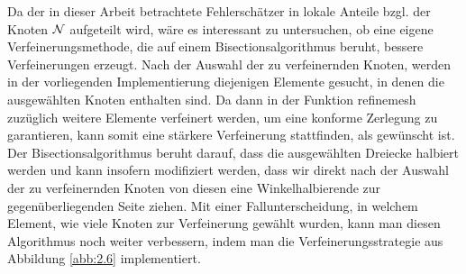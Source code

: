 Da der in dieser Arbeit betrachtete Fehlerschätzer in lokale Anteile bzgl. der Knoten $\mathcal N$ aufgeteilt wird, wäre es interessant zu untersuchen, ob eine eigene Verfeinerungsmethode, die auf einem Bisectionsalgorithmus beruht, bessere Verfeinerungen erzeugt. Nach der Auswahl der zu verfeinernden Knoten, werden in der vorliegenden Implementierung diejenigen Elemente gesucht, in denen die ausgewählten Knoten enthalten sind. Da dann in der Funktion {\ttfamily refinemesh} zuzüglich weitere Elemente verfeinert werden, um eine konforme Zerlegung zu garantieren, kann somit eine stärkere Verfeinerung stattfinden, als gewünscht ist. Der Bisectionsalgorithmus beruht darauf, dass die ausgewählten Dreiecke halbiert werden und kann insofern modifiziert werden, dass wir direkt nach der Auswahl der zu verfeinernden Knoten von diesen eine Winkelhalbierende zur gegenüberliegenden Seite ziehen. Mit einer Fallunterscheidung, in welchem Element, wie viele Knoten zur Verfeinerung gewählt wurden, kann man diesen Algorithmus noch weiter verbessern, indem man die Verfeinerungsstrategie aus Abbildung \ref{abb:2.6} implementiert.

\newpage

